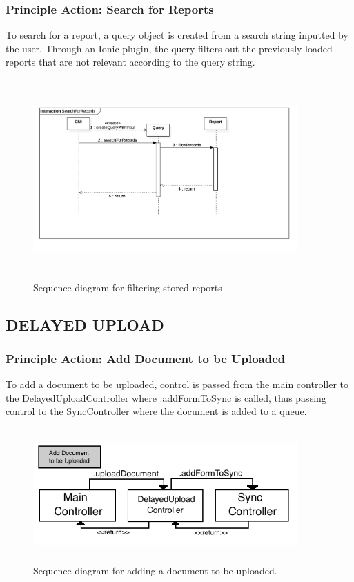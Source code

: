 \documentclass[twoside,letterpaper]{article}
\begin{document}
{\subsubsection{Principle Action: Search for Reports}
To search for a report, a query object is created from a search string inputted by the user. Through an Ionic plugin, the query filters out the previously loaded reports that are not relevant according to the query string.
\begin{figure}[H]
\centering
\includegraphics[width=4in,height=3in]{SearchForRecords.png}
\caption{Sequence diagram for filtering stored reports}
\end{figure}
\subsection[DELAYED UPLOAD]{\rmfamily\bfseries\color{black}
DELAYED UPLOAD}
\subsubsection{Principle Action: Add Document to be Uploaded}
To add a document to be uploaded, control is passed from the main controller to the DelayedUploadController where .addFormToSync is called, thus passing control to the SyncController where the document is added to a queue.
\begin{figure}[H]
\centering
\includegraphics[width=4in,height=2in]{Add.jpg}
\caption{Sequence diagram for adding a document to be uploaded.}
\end{figure}
}
\end{document}
